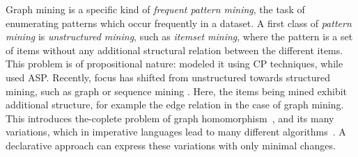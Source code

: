 Graph mining is a specific kind of \emph{frequent pattern mining}, 
the task of enumerating patterns which occur frequently in a dataset.
A first class of \emph{pattern mining} is \emph{unstructured mining}, such as \emph{itemset mining}, where the pattern is a set of items without any additional structural relation between the different items. 
This problem is of propositional nature:
\citet{tias_original} modeled it using CP techniques, while \citet{asp_itemset} used ASP.
Recently, focus has shifted from unstructured towards structured mining, such as graph or sequence mining \citet{cp_sequence_mining,asp_sequence}.
Here, the items being mined exhibit additional structure, for example the edge relation in the case of graph mining.
This introduces the\NP-coplete problem of graph homomorphism~\citep{Lev73},
and its many variations, which in imperative languages lead to many different algorithms~\citep{gspan,theta_subsumption}.
A declarative approach can express these variations with only minimal changes.

